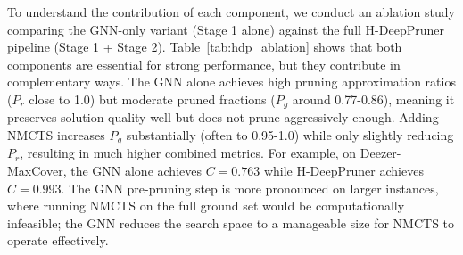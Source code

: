 To understand the contribution of each component, we conduct an ablation study comparing
the GNN-only variant (Stage 1 alone) against the full H-DeepPruner pipeline (Stage 1 +
Stage 2). Table~\ref{tab:hdp_ablation} shows that both components are essential for strong
performance, but they contribute in complementary ways. The GNN alone achieves high pruning approximation ratios
($P_r$ close to 1.0) but moderate pruned fractions ($P_g$ around 0.77-0.86), meaning it
preserves solution quality well but does not prune aggressively enough. Adding NMCTS
increases $P_g$ substantially (often to 0.95-1.0) while only slightly reducing $P_r$,
resulting in much higher combined metrics. For example, on Deezer-MaxCover, the GNN alone
achieves $C = 0.763$ while H-DeepPruner achieves $C = 0.993$. The GNN pre-pruning step
is more pronounced on larger instances, where running NMCTS on the full ground set would
be computationally infeasible; the GNN reduces the search space to a manageable size for
NMCTS to operate effectively.


